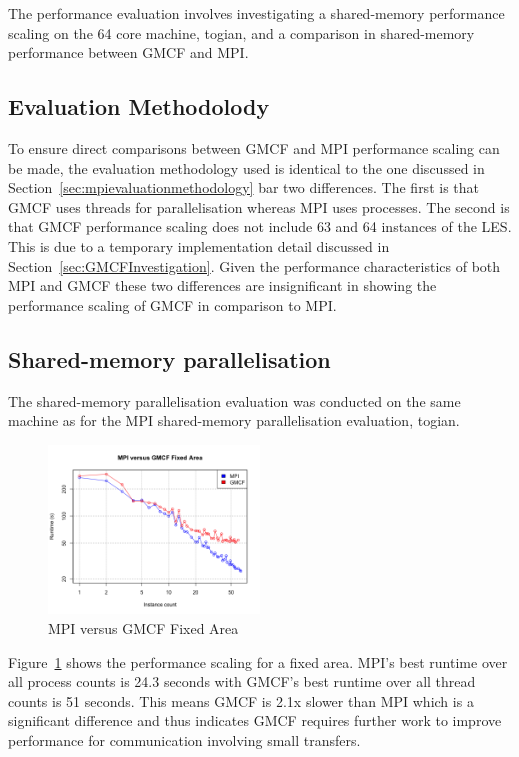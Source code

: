 The performance evaluation involves investigating a shared-memory performance
scaling on the 64 core machine, togian, and a comparison in shared-memory
performance between GMCF and MPI.

\subsection{Evaluation Methodolody}

To ensure direct comparisons between GMCF and MPI performance scaling can be
made, the evaluation methodology used is identical to the one discussed in
Section~\ref{sec:mpievaluationmethodology} bar two differences. The first is
that GMCF uses threads for parallelisation whereas MPI uses processes. The
second is that GMCF performance scaling does not include 63 and 64 instances of
the LES. This is due to a temporary implementation detail discussed in
Section~\ref{sec:GMCFInvestigation}. Given the performance characteristics of
both MPI and GMCF these two differences are insignificant in showing the
performance scaling of GMCF in comparison to MPI.

\subsection{Shared-memory parallelisation}

The shared-memory parallelisation evaluation was conducted on the same machine
as for the MPI shared-memory parallelisation evaluation, togian.

\begin{figure}
    \includegraphics[width=0.5\textwidth]{graphs/GMCF-MPI-fixed-area.png}
    \caption{MPI versus GMCF Fixed Area}
    \label{fig:gmcfmpifixedarea}
\end{figure}

Figure~\ref{fig:gmcfmpifixedarea} shows the performance scaling for a fixed
area. MPI's best runtime over all process counts is 24.3 seconds with GMCF's
best runtime over all thread counts is 51 seconds. This means GMCF is 2.1x
slower than MPI which is a significant difference and thus indicates GMCF
requires further work to improve performance for communication involving small
transfers.

